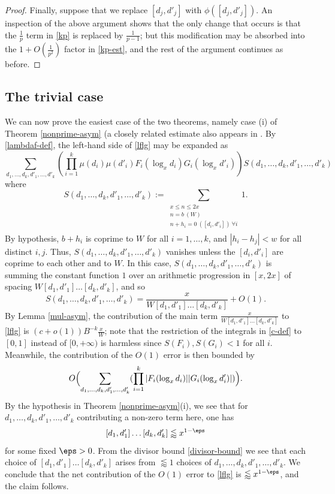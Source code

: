 \begin{proof}
Finally, suppose that we replace $[d_j,d'_j]$ with $\phi([d_j,d'_j])$.  An inspection of the above argument shows that the only change that occurs is that the $\frac{1}{p}$ term in \eqref{kp} is replaced by $\frac{1}{p-1}$; but this modification may be absorbed into the $1+O(\frac{1}{p^2})$ factor in \eqref{kp-est}, and the rest of the argument continues as before.
\end{proof}

\subsection{The trivial case}\label{triv-sec}

We can now prove the easiest case of the two theorems, namely case (i) of Theorem \ref{nonprime-asym} (a closely related estimate also appears in \cite[Lemma 6.2]{maynard-new}.  By \eqref{lambdaf-def}, the left-hand side of \eqref{lflg} may be expanded as
\begin{equation}\label{lflg-expand}
 \sum_{d_1,\dots,d_k,d'_1,\dots,d'_k} \left(\prod_{i=1}^k \mu(d_i) \mu(d'_i) F_i(\log_x d_i) G_i(\log_x d'_i)\right) S(d_1,\dots,d_k,d'_1,\dots,d'_k)
\end{equation}
where
$$ S(d_1,\dots,d_k,d'_1,\dots,d'_k) := 
 \sum_{\substack{x \leq n \leq 2x\\ n = b\ (W) \\ n + h_i = 0\ ([d_i,d'_i])\ \forall i\\}} 1.
$$
By hypothesis, $b+h_i$ is coprime to $W$ for all $i=1,\dots,k$, and $|h_i-h_j| < w$ for all distinct $i,j$.  Thus, $S(d_1,\dots,d_k,d'_1,\dots,d'_k)$ vanishes unless the $[d_i,d'_i]$ are coprime to each other and to $W$.  In this case, $S(d_1,\dots,d_k,d'_1,\dots,d'_k)$ is summing the constant function $1$ over an arithmetic progression in $[x,2x]$ of spacing $W [d_1,d'_1] \dots [d_k,d'_k]$, and so  
$$ S(d_1,\dots,d_k,d'_1,\dots,d'_k) = \frac{x}{W [d_1,d'_1] \dots [d_k,d'_k]} + O(1).$$
By Lemma \ref{mul-asym}, the contribution of the main term
$\frac{x}{W [d_1,d'_1] \dots [d_k,d'_k]}$ to \eqref{lflg} is $(c+o(1)) B^{-k} \frac{x}{W}$; note that the restriction of the integrals in \eqref{c-def} to $[0,1]$ instead of $[0,+\infty)$ is harmless since $S(F_i), S(G_i) < 1$ for all $i$.  Meanwhile, the contribution of the $O(1)$ error is then bounded by
$$
O\Bigl( \sum_{d_1,\dots,d_k,d'_1,\dots,d'_k} (\prod_{i=1}^k |F_i(\log_x d_i)| |G_i(\log_x d'_i)|)\Bigr).$$
By the hypothesis in Theorem \ref{nonprime-asym}(i), we see that for $d_1,\dots,d_k,d'_1,\dots,d'_k$ contributing a non-zero term here, one has
$$
[d_1,d'_1] \dots [d_k,d'_k] \lessapprox x^{1-\eps}$$
for some fixed $\eps>0$. From the divisor bound \eqref{divisor-bound} we see that each choice of $[d_1,d'_1] \dots [d_k,d'_k]$ arises from $\lessapprox 1$ choices of $d_1,\dots,d_k,d'_1,\dots,d'_k$.  We conclude that the net contribution of the $O(1)$ error to \eqref{lflg} is $\lessapprox x^{1-\eps}$, and the claim follows.

